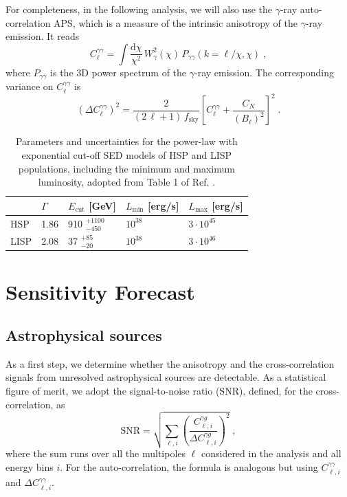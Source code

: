 \documentclass[aps,prd,a4paper,reprint,nofootinbib,superscriptaddress,floatfix,preprintnumbers]{revtex4-2}
\newcommand{\de}{\textrm{d}}
\newcommand{\be}{\begin{equation}}
\newcommand{\ee}{\end{equation}}
\let\Gamma\varGamma
\let\Delta\varDelta
\begin{document}
For completeness, in the following analysis, we will also use the $\gamma$-ray auto-correlation APS, which is a measure of the intrinsic anisotropy of the $\gamma$-ray emission. It reads~\cite{Ando:2013ff,Camera:2012cj,Camera_2015,Fornengo:2013rga}
\begin{equation}
 C_\ell^{\gamma \gamma}=\int \frac{\de\chi}{\chi^2}\,W_{\gamma}^2(\chi)  
 \,P_{\gamma \gamma}\left(k=\ell/\chi,\chi\right)\;,
\label{eq:clfin}    
\end{equation}
where $P_{\gamma \gamma}$ is the 3D power spectrum of the $\gamma$-ray emission. The corresponding variance on $C_\ell^{\gamma \gamma}$ is~{\cite{Camera:2012cj,Camera_2015,Fornengo:2013rga}}
\be
(\Delta C_\ell^{\gamma \gamma})^2 = \frac{2}{(2\,\ell+1)\,f_\textrm{sky}} \left[C_\ell^{\gamma \gamma} + \frac{C_N}{(B_\ell)^2} \right]^2\;.\label{eq:variance_gammagamma}
\ee


\begin{table}[t!]
\centering
\begin{tabular}{|m{} |m{} m{} m{} m{}|} 
\hline
  & $\Gamma$ & $E_{\text{cut}}$ [GeV] & $L_\textrm{min}$ [erg/s] & $L_\textrm{max}$ [erg/s]  \\ [0.5ex]
 \hline
 HSP & 1.86 & 910 $^{+1100}_{-450}$ & $10^{38}$ & $3\cdot 10^{45}$  \\ [0.5ex]
 LISP & 2.08 & 37 $^{+85}_{-20}$ & $10^{38}$ & $3\cdot 10^{46}$ \\ [1ex]
 \hline 
\end{tabular}
\caption{Parameters and uncertainties for the power-law with exponential cut-off SED models of HSP and LISP populations, including the minimum and maximum luminosity, adopted from Table 1 of Ref. \cite{DiMauro:2013zfa}.}
\label{table:BLLACS}
\end{table}

\section{Sensitivity Forecast}\label{sec:sens}


\subsection{Astrophysical sources}

As a first step, we determine whether the anisotropy and the cross-correlation signals from unresolved astrophysical sources are detectable. As a statistical figure of merit, we adopt the signal-to-noise ratio (SNR), defined, for the cross-correlation, as
\begin{equation}
    \textrm{SNR} = \sqrt{\sum_{\ell, i} \left(\frac{C_{\ell, i}^{\gamma g}}{\Delta C_{\ell, i}^{\gamma g}}\right)^2}\;,
    \label{eq:SNR2}
\end{equation}
%
where the sum runs over all the multipoles $\ell$ considered in the analysis and all energy bins $i$. For the auto-correlation, the formula is analogous but using $C_{\ell, i}^{{\gamma \gamma}}$ and $\Delta C_{\ell,i}^{\gamma \gamma}$.
\end{document}
